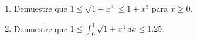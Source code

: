 \item 
\begin{enumerate}
    \item[(a)] Demuestre que $1 \le \sqrt{1 + x^3} \le 1 + x^3$ para $x \ge 0$.
    \item[(b)] Demuestre que $1 \le \int_0^1 \sqrt{1 + x^3} dx \le 1.25$.
\end{enumerate}
